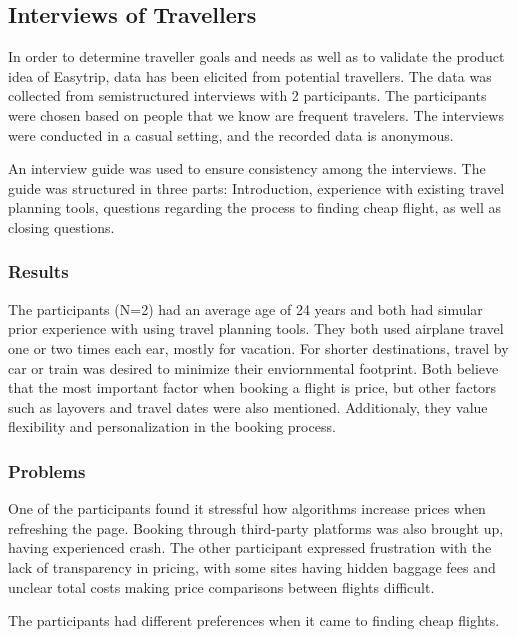 \subsection{Interviews of Travellers}
In order to determine traveller goals and needs as well as to validate the product idea of Easytrip, data has been elicited from potential travellers. The data was collected from semistructured interviews with 2 participants. The participants were chosen based on people that we know are frequent travelers. The interviews were conducted in a casual setting, and the recorded data is anonymous.

An interview guide was used to ensure consistency among the interviews. The guide was structured in three parts: Introduction, experience with existing travel planning tools, questions regarding the process to finding cheap flight, as well as closing questions. 

\subsubsection{Results}
The participants (N=2) had an average age of 24 years and both had simular prior experience with using travel planning tools. They both used airplane travel one or two times each ear, mostly for vacation. For shorter destinations, travel by car or train was desired to minimize their enviornmental footprint. Both believe that the most important factor when booking a flight is price, but other factors such as layovers and travel dates were also mentioned. Additionaly, they value flexibility and personalization in the booking process. 

\subsubsection{Problems}
One of the participants found it stressful how algorithms increase prices when refreshing the page. Booking through third-party platforms was also brought up, having experienced crash. The other participant expressed frustration with the lack of transparency in pricing, with some sites having hidden baggage fees and unclear total costs making price comparisons between flights difficult. 


The participants had different preferences when it came to finding cheap flights. 


